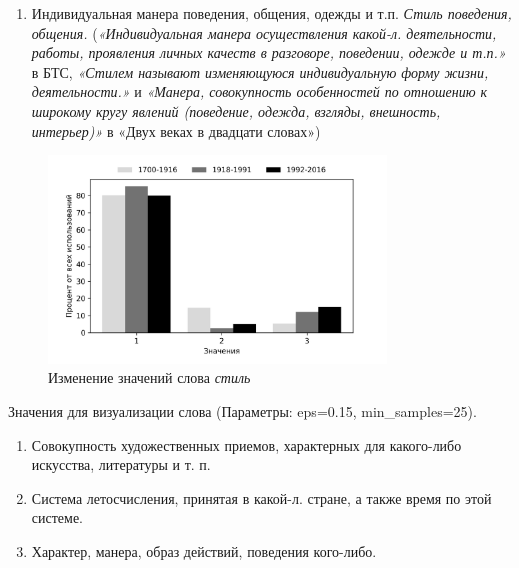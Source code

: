 \begin{enumerate}
    \item Индивидуальная манера поведения, общения, одежды и т.п. \textit{Стиль поведения, общения.}
(\textit{«Индивидуальная манера осуществления какой-л. деятельности, работы, проявления личных качеств в разговоре, поведении, одежде и т.п.»} в БТС,
\textit{«Стилем называют изменяющуюся индивидуальную форму жизни, деятельности.»} и \textit{«Манера, совокупность особенностей по отношению к широкому кругу явлений (поведение, одежда, взгляды, внешность, интерьер)»} в «Двух веках в двадцати словах»)


\end{enumerate}

\begin{figure}[H]
	\centering
	\includegraphics[width=0.8\textwidth]{img/visualizations/stil'_minimal}
	\caption{Изменение значений слова \textit{стиль}}
	\label{fig:Стиль_книга}
\end{figure}

Значения для визуализации слова  (Параметры: eps=0.15, min\_samples=25).

\begin{enumerate}
    \item Совокупность художественных приемов, характерных для какого-либо искусства, литературы и т. п.
    \item Система летосчисления, принятая в какой-л. стране, а также время по этой системе.
    \item Характер, манера, образ действий, поведения кого-либо.
\end{enumerate}

